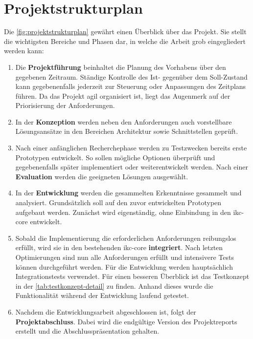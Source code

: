 \section{Projektstrukturplan}
Die \autoref{fig:projektstrukturplan} gewährt einen Überblick über das Projekt. Sie stellt die wichtigsten Bereiche und Phasen dar, in welche die Arbeit grob eingegliedert werden kann:
\begin{enumerate}
    \item Die \textbf{Projektführung} beinhaltet die Planung des Vorhabens über den gegebenen Zeitraum. Ständige Kontrolle des Ist- gegenüber dem Soll-Zustand kann gegebenenfalls jederzeit zur Steuerung oder Anpassungen des Zeitplans führen. Da das Projekt agil organisiert ist, liegt das Augenmerk auf der Priorisierung der Anforderungen.
    \item In der \textbf{Konzeption} werden neben den Anforderungen auch vorstellbare Lös\-ungs\-an\-sätz\-e in den Bereichen Architektur sowie Schnittstellen geprüft.
    \item Nach einer anfänglichen Recherchephase werden zu Testzwecken bereits erste Prototypen entwickelt. So sollen mögliche Optionen überprüft und gegebenenfalls später implementiert oder weiterentwickelt werden. Nach einer \textbf{Evaluation} werden die geeigneten Lösungen ausgewählt.
    \item In der \textbf{Entwicklung} werden die gesammelten Erkenntnisse gesammelt und analysiert. Grundsätzlich soll auf den zuvor entwickelten Prototypen aufgebaut werden. Zunächst wird ei\-gen\-stän\-dig, ohne Einbindung in den \gls{ikc-core} entwickelt.
    \item Sobald die Implementierung die erforderlichen Anforderungen reibungslos erfüllt, wird sie in den bestehenden \gls{ikc-core} \textbf{integriert}. Nach letzten Optimierungen sind nun alle Anforderungen erfüllt und intensivere Tests können durchgeführt werden. Für die Entwicklung werden hauptsächlich Integrationstests verwendet. Für einen besseren Überblick ist das Testkonzept in der \autoref{tab:testkonzept-detail} zu finden. Anhand dieses wurde die Funktionalität während der Entwicklung laufend getestet.
    \item Nachdem die Entwicklungsarbeit abgeschlossen ist, folgt der \textbf{Projektabschluss}. Dabei wird die endgültige Version des Projektreports erstellt und die Abschlusspräsentation gehalten.
\end{enumerate}

